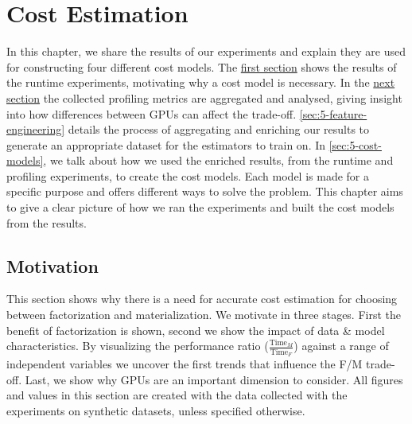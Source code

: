 
\chapter{Cost Estimation}

\label{chapter:cost-estimation}
In this chapter, we share the results of our experiments and explain they are used for constructing four different cost models. The \hyperref[sec:5-motivation]{first section} shows the results of the runtime experiments, motivating why a cost model is necessary. In the \hyperref[sec:5-gpu-performance-analysis]{next section} the collected profiling metrics are aggregated and analysed, giving insight into how differences between GPUs can affect the trade-off. \autoref{sec:5-feature-engineering} details the process of aggregating and enriching our results to generate an appropriate dataset for the estimators to train on. In \autoref{sec:5-cost-models}, we talk about how we used the enriched results, from the runtime and profiling experiments, to create the cost models. Each model is made for a specific purpose and offers different ways to solve the problem. This chapter aims to give a clear picture of how we ran the experiments and built the cost models from the results.

\section{Motivation}
\label{sec:5-motivation}
This section shows why there is a need for accurate cost estimation for choosing between factorization and materialization. We motivate in three stages. First the benefit of factorization is shown, second we show the impact of data \& model characteristics. By visualizing the performance ratio ($\frac{\text{Time}_M}{\text{Time}_F}$) against a range of independent variables we uncover the first trends that influence the F/M trade-off. Last, we show why GPUs are an important dimension to consider. All figures and values in this section are created with the data collected with the experiments on synthetic datasets, unless specified otherwise.

